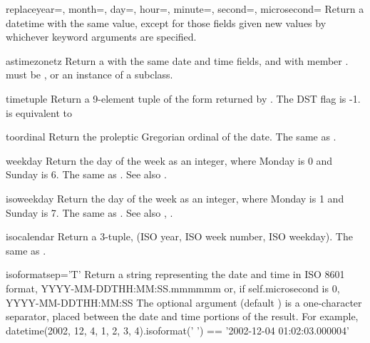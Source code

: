 \begin{methoddesc}{replace}{year=, month=, day=, hour=, minute=, second=, microsecond=}
    Return a datetime with the same value, except for those fields given
    new values by whichever keyword arguments are specified.
\end{methoddesc}

\begin{methoddesc}{astimezone}{tz}
    Return a  with the same date and time fields, and
    with  member .   must be ,
    or an instance of a  subclass.
\end{methoddesc}

\begin{methoddesc}{timetuple}{}
    Return a 9-element tuple of the form returned by
    .
    The DST flag is -1.    is equivalent to
\end{methoddesc}

\begin{methoddesc}{toordinal}{}
    Return the proleptic Gregorian ordinal of the date.  The same as
    .
\end{methoddesc}

\begin{methoddesc}{weekday}{}
    Return the day of the week as an integer, where Monday is 0 and
    Sunday is 6.  The same as .
    See also .
\end{methoddesc}

\begin{methoddesc}{isoweekday}{}
    Return the day of the week as an integer, where Monday is 1 and
    Sunday is 7.  The same as .
    See also , .
\end{methoddesc}

\begin{methoddesc}{isocalendar}{}
    Return a 3-tuple, (ISO year, ISO week number, ISO weekday).  The
    same as .
\end{methoddesc}

\begin{methoddesc}{isoformat}{sep='T'}
    Return a string representing the date and time in ISO 8601 format,
        YYYY-MM-DDTHH:MM:SS.mmmmmm
    or, if self.microsecond is 0,
        YYYY-MM-DDTHH:MM:SS
    The optional argument  (default ) is a
    one-character separator, placed between the date and time portions
    of the result.  For example,
        datetime(2002, 12, 4, 1, 2, 3, 4).isoformat(' ') ==
        '2002-12-04 01:02:03.000004'
\end{methoddesc}

